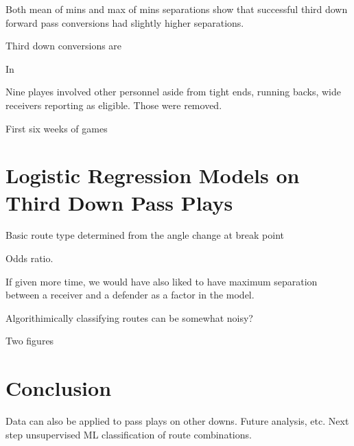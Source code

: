 \documentclass[12pt,letterpaper]{article}
\begin{document}
Both mean of mins and max of mins separations show that successful third down forward pass conversions had slightly higher separations.

Third down conversions are 

In

Nine playes involved other personnel aside from tight ends, running backs, wide receivers reporting as eligible. Those were removed.

First six weeks of games

\section*{Logistic Regression Models on Third Down Pass Plays}

Basic route type determined from the angle change at break point

Odds ratio.

If given more time, we would have also liked to have maximum separation between a receiver and a defender as a factor in the model.

Algorithimically classifying routes can be somewhat noisy?

Two figures

\section*{Conclusion}

Data can also be applied to pass plays on other downs. Future analysis, etc. Next step unsupervised ML classification of route combinations.
\end{document}
